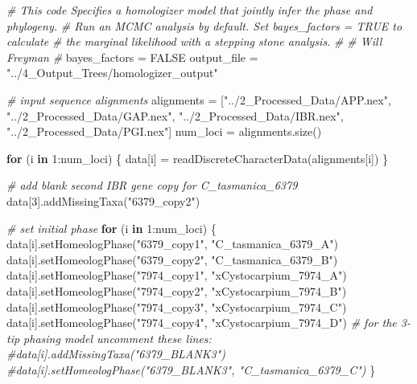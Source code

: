\documentclass[
]{book}
\newenvironment{Shaded}{\begin{snugshade}}{\end{snugshade}}
\newcommand{\CommentTok}[1]{\textcolor[rgb]{0.56,0.35,0.01}{\textit{#1}}}
\newcommand{\ConstantTok}[1]{\textcolor[rgb]{0.00,0.00,0.00}{#1}}
\newcommand{\ControlFlowTok}[1]{\textcolor[rgb]{0.13,0.29,0.53}{\textbf{#1}}}
\newcommand{\DecValTok}[1]{\textcolor[rgb]{0.00,0.00,0.81}{#1}}
\newcommand{\FunctionTok}[1]{\textcolor[rgb]{0.00,0.00,0.00}{#1}}
\newcommand{\NormalTok}[1]{#1}
\newcommand{\OtherTok}[1]{\textcolor[rgb]{0.56,0.35,0.01}{#1}}
\newcommand{\SpecialCharTok}[1]{\textcolor[rgb]{0.00,0.00,0.00}{#1}}
\newcommand{\StringTok}[1]{\textcolor[rgb]{0.31,0.60,0.02}{#1}}
\begin{document}
\begin{Shaded}
\begin{Highlighting}[]
\CommentTok{\# This code Specifies a homologizer model that jointly infer the phase and phylogeny.}
\CommentTok{\# Run an MCMC analysis by default. Set bayes\_factors = TRUE to calculate}
\CommentTok{\# the marginal likelihood with a stepping stone analysis.}
\CommentTok{\#}
\CommentTok{\# Will Freyman}
\CommentTok{\#}
\NormalTok{bayes\_factors }\OtherTok{=} \ConstantTok{FALSE}
\NormalTok{output\_file }\OtherTok{=} \StringTok{"../4\_Output\_Trees/homologizer\_output"}

\CommentTok{\# input sequence alignments}
\NormalTok{alignments }\OtherTok{=}\NormalTok{ [}\StringTok{"../2\_Processed\_Data/APP.nex"}\NormalTok{,}
              \StringTok{"../2\_Processed\_Data/GAP.nex"}\NormalTok{,}
              \StringTok{"../2\_Processed\_Data/IBR.nex"}\NormalTok{,}
              \StringTok{"../2\_Processed\_Data/PGI.nex"}\NormalTok{]}
\NormalTok{num\_loci }\OtherTok{=} \FunctionTok{alignments.size}\NormalTok{()}

\ControlFlowTok{for}\NormalTok{ (i }\ControlFlowTok{in} \DecValTok{1}\SpecialCharTok{:}\NormalTok{num\_loci) \{}
\NormalTok{    data[i] }\OtherTok{=} \FunctionTok{readDiscreteCharacterData}\NormalTok{(alignments[i])}
\NormalTok{\}}

\CommentTok{\# add blank second IBR gene copy for C\_tasmanica\_6379}
\NormalTok{data[}\DecValTok{3}\NormalTok{]}\FunctionTok{.addMissingTaxa}\NormalTok{(}\StringTok{"6379\_copy2"}\NormalTok{)}

\CommentTok{\# set initial phase}
\ControlFlowTok{for}\NormalTok{ (i }\ControlFlowTok{in} \DecValTok{1}\SpecialCharTok{:}\NormalTok{num\_loci) \{}
\NormalTok{    data[i]}\FunctionTok{.setHomeologPhase}\NormalTok{(}\StringTok{"6379\_copy1"}\NormalTok{, }\StringTok{"C\_tasmanica\_6379\_A"}\NormalTok{)}
\NormalTok{    data[i]}\FunctionTok{.setHomeologPhase}\NormalTok{(}\StringTok{"6379\_copy2"}\NormalTok{, }\StringTok{"C\_tasmanica\_6379\_B"}\NormalTok{)}
\NormalTok{    data[i]}\FunctionTok{.setHomeologPhase}\NormalTok{(}\StringTok{"7974\_copy1"}\NormalTok{, }\StringTok{"xCystocarpium\_7974\_A"}\NormalTok{)}
\NormalTok{    data[i]}\FunctionTok{.setHomeologPhase}\NormalTok{(}\StringTok{"7974\_copy2"}\NormalTok{, }\StringTok{"xCystocarpium\_7974\_B"}\NormalTok{)}
\NormalTok{    data[i]}\FunctionTok{.setHomeologPhase}\NormalTok{(}\StringTok{"7974\_copy3"}\NormalTok{, }\StringTok{"xCystocarpium\_7974\_C"}\NormalTok{)}
\NormalTok{    data[i]}\FunctionTok{.setHomeologPhase}\NormalTok{(}\StringTok{"7974\_copy4"}\NormalTok{, }\StringTok{"xCystocarpium\_7974\_D"}\NormalTok{)}
    \CommentTok{\# for the 3{-}tip phasing model uncomment these lines:}
    \CommentTok{\#data[i].addMissingTaxa("6379\_BLANK3")}
    \CommentTok{\#data[i].setHomeologPhase("6379\_BLANK3", "C\_tasmanica\_6379\_C")}
\NormalTok{\}}


\end{Highlighting}
\end{Shaded}
\end{document}

